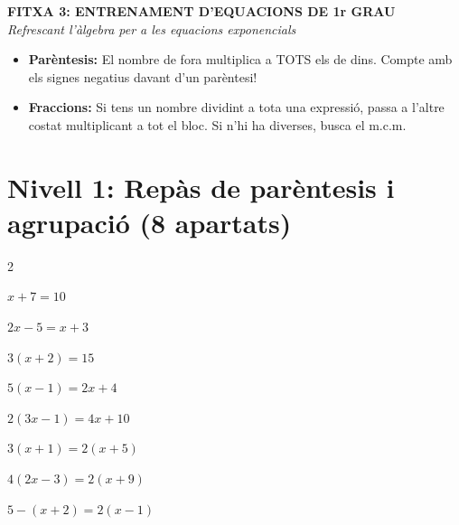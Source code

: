 \documentclass[12pt,a4paper]{article}
\begin{document}
\begin{center}
    \textbf{\Large FITXA 3: ENTRENAMENT D'EQUACIONS DE 1r GRAU} \\
    \vspace{0.2cm}
    \textit{Refrescant l'àlgebra per a les equacions exponencials}
\end{center}

\vspace{0.3cm}

\begin{tcolorbox}[colback=grisblavet, colframe=blaufosc, title=\textbf{Consells clau}]
    \begin{itemize}
        \item \textbf{Parèntesis:} El nombre de fora multiplica a TOTS els de dins. Compte amb els signes negatius davant d'un parèntesi!
        \item \textbf{Fraccions:} Si tens un nombre dividint a tota una expressió, passa a l'altre costat multiplicant a tot el bloc. Si n'hi ha diverses, busca el m.c.m.
    \end{itemize}
\end{tcolorbox}

\vspace{0.4cm}

\section*{Nivell 1: Repàs de parèntesis i agrupació (8 apartats)}
\begin{multicols}{2}
\begin{exercicis}
    \item $x + 7 = 10$
    \item $2x - 5 = x + 3$
    \item $3(x + 2) = 15$
    \item $5(x - 1) = 2x + 4$
    \item $2(3x - 1) = 4x + 10$
    \item $3(x + 1) = 2(x + 5)$
    \item $4(2x - 3) = 2(x + 9)$
    \item $5 - (x + 2) = 2(x - 1)$
\end{exercicis}
\end{multicols}

\vspace{0.6cm}

\end{document}
